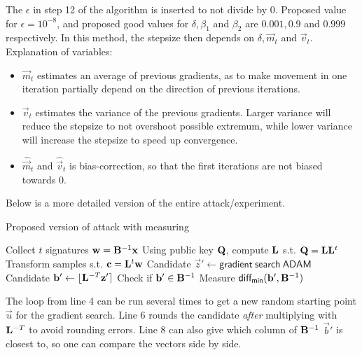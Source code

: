 {{The $\epsilon$ in step 12 of the algorithm is inserted to not divide by 0. Proposed value for $\epsilon = 10^{-8}$,
and proposed good values for $\delta, \beta_1$ and $\beta_2$ are $0.001, 0.9$ and $0.999$ respectively.
In this method, the stepsize then depends on $\delta, \vec{m}_t$ and $\vec{v}_t$.
Explanation of variables:
\begin{itemize}
    \item $\vec{m}_t$ estimates an average of previous gradients, as to make movement in one iteration partially depend on the direction of previous iterations.
    \item $\vec{v}_t$ estimates the variance of the previous gradients. Larger variance will reduce the stepsize to not overshoot possible extremum, while lower variance will increase the stepsize to speed up convergence.
    \item $\hat{\vec{m}}_t$ and $\hat{\vec{v}}_t$ is bias-correction, so that the first iterations are not biased towards 0.
\end{itemize}

Below is a more detailed version of the entire attack/experiment.
\begin{algorithm}[H]
\caption{Proposed version of attack with measuring}
\begin{algorithmic}[1]
    \State Collect $t$ signatures $\mathbf{w} = \mathbf{B}^{-1} \mathbf{x}$ 
    \State Using public key $\mathbf{Q}$, compute $\mathbf{L}$ s.t. $\mathbf{Q} = \mathbf{L} \mathbf{L}^t$
    \State Transform samples s.t. $\mathbf{c} = \mathbf{L}^t \mathbf{w}$
    \Loop
    \State Candidate $\vec{z}' \gets \mathsf{gradient \ search  \ ADAM}$ 
    \State Candidate $\mathbf{b}' \gets \lfloor \mathbf{L}^{-T} \mathbf{z}' \rceil$ 
    \State Check if $\mathbf{b}' \in \mathbf{B}^{-1}$
    \State Measure $\mathsf{diff_{min}}(\mathbf{b}', \mathbf{B}^{-1})$
    \EndLoop
\end{algorithmic}
\end{algorithm}

The loop from line 4 can be run several times to get a new random starting point $\vec{u}$ for the gradient search.
Line 6 rounds the candidate \textit{after} multiplying with $\mathbf{L}^{-T}$ to avoid rounding errors.
Line 8 can also give which column of $\mathbf{B}^{-1}$ $\vec{b}'$ is closest to, so one can compare the vectors side by side.

}}
